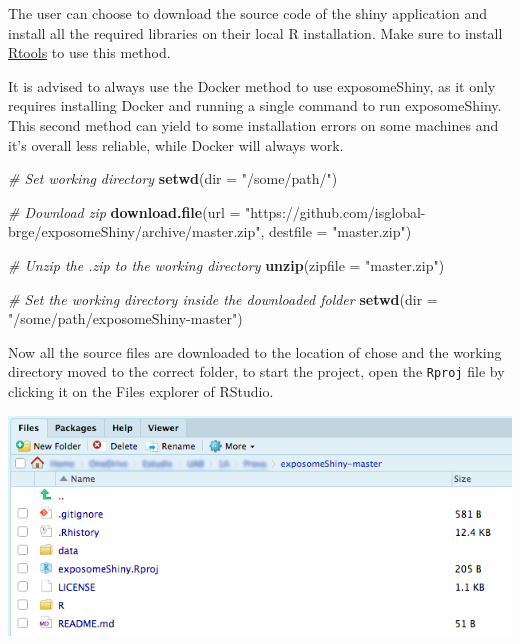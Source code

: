 \documentclass[
]{book}
\newenvironment{Shaded}{\begin{snugshade}}{\end{snugshade}}
\newcommand{\CommentTok}[1]{\textcolor[rgb]{0.56,0.35,0.01}{\textit{#1}}}
\newcommand{\DataTypeTok}[1]{\textcolor[rgb]{0.13,0.29,0.53}{#1}}
\newcommand{\KeywordTok}[1]{\textcolor[rgb]{0.13,0.29,0.53}{\textbf{#1}}}
\newcommand{\NormalTok}[1]{#1}
\newcommand{\StringTok}[1]{\textcolor[rgb]{0.31,0.60,0.02}{#1}}
\begin{document}
The user can choose to download the source code of the shiny application and install all the required libraries on their local R installation. Make sure to install \href{https://cran.r-project.org/bin/windows/Rtools/history.html}{Rtools} to use this method.

It is advised to always use the Docker method to use exposomeShiny, as it only requires installing Docker and running a single command to run exposomeShiny. This second method can yield to some installation errors on some machines and it's overall less reliable, while Docker will always work.

\begin{Shaded}
\begin{Highlighting}[]
  \CommentTok{# Set working directory}
\KeywordTok{setwd}\NormalTok{(}\DataTypeTok{dir =} \StringTok{"/some/path/"}\NormalTok{)}
      
  \CommentTok{# Download zip}
\KeywordTok{download.file}\NormalTok{(}\DataTypeTok{url =} \StringTok{"https://github.com/isglobal-brge/exposomeShiny/archive/master.zip"}\NormalTok{, }\DataTypeTok{destfile =} \StringTok{"master.zip"}\NormalTok{)}

  \CommentTok{# Unzip the .zip to the working directory}
\KeywordTok{unzip}\NormalTok{(}\DataTypeTok{zipfile =} \StringTok{"master.zip"}\NormalTok{)}

  \CommentTok{# Set the working directory inside the downloaded folder}
\KeywordTok{setwd}\NormalTok{(}\DataTypeTok{dir =} \StringTok{"/some/path/exposomeShiny-master"}\NormalTok{)}
\end{Highlighting}
\end{Shaded}

Now all the source files are downloaded to the location of chose and the working directory moved to the correct folder, to start the project, open the \texttt{Rproj} file by clicking it on the Files explorer of RStudio.

\includegraphics{images/setup1.png}
\end{document}
